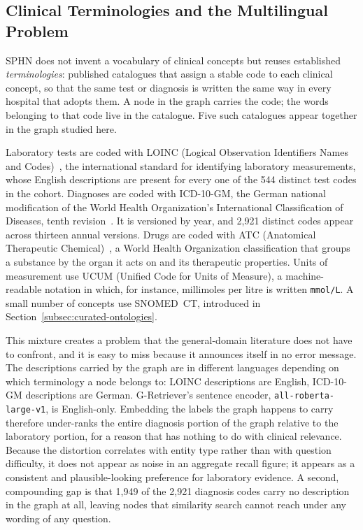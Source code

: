 \subsection{Clinical Terminologies and the Multilingual Problem} \label{subsec:terminologies}

SPHN does not invent a vocabulary of clinical concepts but reuses established
\emph{terminologies}: published catalogues that assign a stable code to each
clinical concept, so that the same test or diagnosis is written the same way in
every hospital that adopts them. A node in the graph carries the code; the words
belonging to that code live in the catalogue. Five such catalogues appear
together in the graph studied here.

Laboratory tests are coded with LOINC (Logical Observation Identifiers Names and
Codes)~\cite{loinc}, the international standard for identifying laboratory
measurements, whose English descriptions are present for every one of the 544
distinct test codes in the cohort. Diagnoses are coded with ICD-10-GM, the German
national modification of the World Health Organization's International
Classification of Diseases, tenth revision~\cite{icd10}. It is versioned by year,
and 2{,}921 distinct codes appear across thirteen annual versions. Drugs are
coded with ATC (Anatomical Therapeutic Chemical)~\cite{atc}, a World Health
Organization classification that groups a substance by the organ it acts on and
its therapeutic properties. Units of measurement use UCUM (Unified Code for Units
of Measure), a machine-readable notation in which, for instance, millimoles per
litre is written \texttt{mmol/L}. A small number of concepts use
SNOMED~CT, introduced in Section~\ref{subsec:curated-ontologies}.

This mixture creates a problem that the general-domain literature does not have
to confront, and it is easy to miss because it announces itself in no error
message. The descriptions carried by the graph are in different languages
depending on which terminology a node belongs to: LOINC descriptions are English,
ICD-10-GM descriptions are German. G-Retriever's sentence encoder,
\texttt{all-roberta-large-v1}, is English-only. Embedding the labels the graph
happens to carry therefore under-ranks the entire diagnosis portion of the graph
relative to the laboratory portion, for a reason that has nothing to do with
clinical relevance. Because the distortion correlates with entity type rather
than with question difficulty, it does not appear as noise in an aggregate recall
figure; it appears as a consistent and plausible-looking preference for
laboratory evidence. A second, compounding gap is that 1{,}949 of the 2{,}921
diagnosis codes carry no description in the graph at all, leaving nodes that
similarity search cannot reach under any wording of any question.

